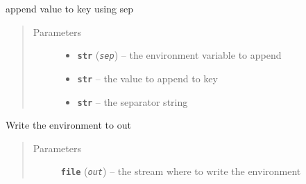 \documentclass[a4paper,10pt,english]{sphinxmanual}
\begin{document}
\begin{fulllineitems}
\begin{fulllineitems}
\begin{quote}
\begin{description}
\end{description}\end{quote}

\end{fulllineitems}


\begin{fulllineitems}
\label{commands/apidoc/src:src.environment.SalomeEnviron.append}
append value to key using sep
\begin{quote}\begin{description}
\item[{Parameters}] \leavevmode\begin{itemize}
\item {} 
\textbf{\texttt{str}} (\emph{\texttt{sep}}) -- the environment variable to append

\item {} 
\textbf{\texttt{str}} -- the value to append to key

\item {} 
\textbf{\texttt{str}} -- the separator string

\end{itemize}

\end{description}\end{quote}

\end{fulllineitems}


\begin{fulllineitems}
\label{commands/apidoc/src:src.environment.SalomeEnviron.dump}
Write the environment to out
\begin{quote}\begin{description}
\item[{Parameters}] \leavevmode
\textbf{\texttt{file}} (\emph{\texttt{out}}) -- the stream where to write the environment

\end{description}\end{quote}

\end{fulllineitems}



\end{fulllineitems}
\end{document}
